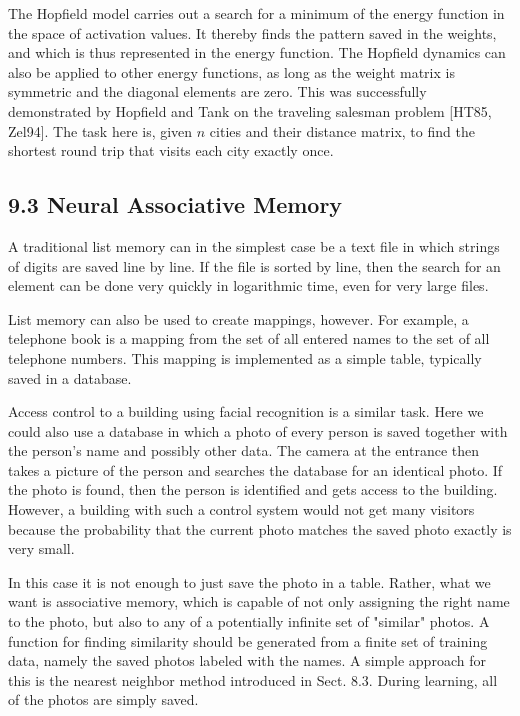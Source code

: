 \documentclass[10pt]{article}
\begin{document}
The Hopfield model carries out a search for a minimum of the energy function in the space of activation values. It thereby finds the pattern saved in the weights, and which is thus represented in the energy function. The Hopfield dynamics can also be applied to other energy functions, as long as the weight matrix is symmetric and the diagonal elements are zero. This was successfully demonstrated by Hopfield and Tank on the traveling salesman problem [HT85, Zel94]. The task here is, given $n$ cities and their distance matrix, to find the shortest round trip that visits each city exactly once.

\subsection*{9.3 Neural Associative Memory}
A traditional list memory can in the simplest case be a text file in which strings of digits are saved line by line. If the file is sorted by line, then the search for an element can be done very quickly in logarithmic time, even for very large files.

List memory can also be used to create mappings, however. For example, a telephone book is a mapping from the set of all entered names to the set of all telephone numbers. This mapping is implemented as a simple table, typically saved in a database.

Access control to a building using facial recognition is a similar task. Here we could also use a database in which a photo of every person is saved together with the person's name and possibly other data. The camera at the entrance then takes a picture of the person and searches the database for an identical photo. If the photo is found, then the person is identified and gets access to the building. However, a building with such a control system would not get many visitors because the probability that the current photo matches the saved photo exactly is very small.

In this case it is not enough to just save the photo in a table. Rather, what we want is associative memory, which is capable of not only assigning the right name to the photo, but also to any of a potentially infinite set of "similar" photos. A function for finding similarity should be generated from a finite set of training data, namely the saved photos labeled with the names. A simple approach for this is the nearest neighbor method introduced in Sect. 8.3. During learning, all of the photos are simply saved.
\end{document}
